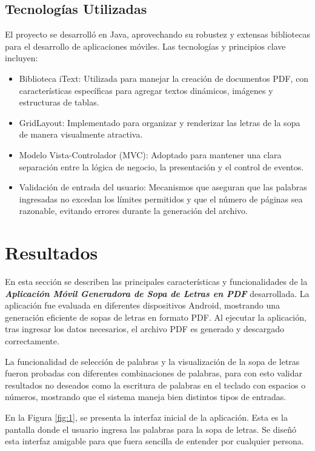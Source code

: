 \documentclass[conference]{IEEEtran}
\begin{document}
\subsection{Tecnologías Utilizadas}
El proyecto se desarrolló en Java, aprovechando su robustez y extensas bibliotecas para el desarrollo de aplicaciones móviles. Las tecnologías y principios clave incluyen:
\begin{itemize}
      \item Biblioteca iText: Utilizada para manejar la creación de documentos PDF, con características específicas para agregar textos dinámicos, imágenes y estructuras de tablas.

       \item GridLayout: Implementado para organizar y renderizar las letras de la sopa de manera visualmente atractiva.

      \item Modelo Vista-Controlador (MVC): Adoptado para mantener una clara separación entre la lógica de negocio, la presentación y el control de eventos.

      \item Validación de entrada del usuario: Mecanismos que aseguran que las palabras ingresadas no excedan los límites permitidos y que el número de páginas sea razonable, evitando errores durante la generación del archivo.
\end{itemize}


\section{Resultados}

En esta sección se describen las principales características y funcionalidades de la \textbf{\textit{Aplicación Móvil Generadora de Sopa de Letras en PDF}} desarrollada. 
La aplicación fue evaluada en diferentes dispositivos Android, mostrando una generación eficiente de sopas de letras en formato PDF. Al ejecutar la aplicación, tras ingresar los datos necesarios, el archivo PDF es generado y descargado correctamente.

La funcionalidad de selección de palabras y la visualización de la sopa de letras fueron probadas con diferentes combinaciones de palabras, para con esto validar resultados no deseados como la escritura de palabras en el teclado con espacios o números, mostrando que el sistema maneja bien distintos tipos de entradas.

En la Figura \ref{fig:1}, se presenta la interfaz inicial de la aplicación. Esta es la pantalla donde el usuario ingresa las palabras para la sopa de letras. Se diseñó esta interfaz amigable para que fuera sencilla de entender por cualquier persona. 
\end{document}
